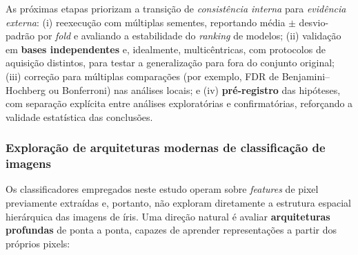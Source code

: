 \documentclass[11pt,a4paper]{article}
\begin{document}
As próximas etapas priorizam a transição de \emph{consistência interna} para \emph{evidência
externa}: (i) reexecução com múltiplas sementes, reportando média \(\pm\) desvio-padrão por
\textit{fold} e avaliando a estabilidade do \textit{ranking} de modelos; (ii) validação em
\textbf{bases independentes} e, idealmente, multicêntricas, com protocolos de aquisição distintos,
para testar a generalização para fora do conjunto original; (iii) correção para múltiplas
comparações (por exemplo, FDR de Benjamini--Hochberg ou Bonferroni) nas análises locais; e
(iv) \textbf{pré-registro} das hipóteses, com separação explícita entre análises exploratórias e
confirmatórias, reforçando a validade estatística das conclusões.

\subsubsection{Exploração de arquiteturas modernas de classificação de imagens}

Os classificadores empregados neste estudo operam sobre \textit{features} de pixel previamente
extraídas e, portanto, não exploram diretamente a estrutura espacial hierárquica das imagens de
íris. Uma direção natural é avaliar \textbf{arquiteturas profundas} de ponta a ponta, capazes de
aprender representações a partir dos próprios pixels:
\end{document}
